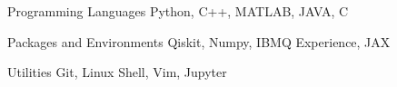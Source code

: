 

\begin{cvskills}

  \cvskill
    {Programming Languages} %
    {Python, C++, MATLAB, JAVA, C} %

  \cvskill
    {Packages and Environments} %
    {Qiskit, Numpy, IBMQ Experience, JAX} %
    

  \cvskill
    {Utilities} %
    {Git, Linux Shell, Vim, Jupyter} %



    
    
  

\end{cvskills}

